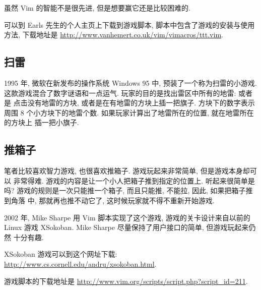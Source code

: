 虽然 Vim 的智能不是很先进, 但是想要赢它还是比较困难的.

可以到 Earls 先生的个人主页上下载到游戏脚本, 脚本中包含了游戏的安装与使用方法,
下载地址是 \url{http://www.vanhemert.co.uk/vim/vimacros/ttt.vim}.

\subsection{扫雷}
\label{subsec:mines}

1995 年, 微软在新发布的操作系统 Windows 95 中, 预装了一个称为扫雷的小游戏.
这款游戏混合了数字谜语和一点运气. 玩家的目的是找出雷区中所有的地雷: 或者是
点击没有地雷的方块, 或者是在有地雷的方块上插一把旗子. 方块下的数字表示周围
8 个小方块下的地雷个数. 如果玩家计算出了地雷所在的位置, 就在地雷所在的方块上
插一把小旗子.

\subsection{推箱子}
\label{subsec:sokoban}

笔者比较喜欢智力游戏, 也很喜欢推箱子. 游戏玩起来非常简单, 但是游戏本身却可以
非常得难. 游戏的内容是让一个小人把箱子推到指定的位置上. 听起来很简单是吗?
游戏的规则是一次只能推一个箱子, 而且只能推, 不能拉, 因此, 如果把箱子推到角落
中, 那就再也推不动它了, 这时候玩家就不得不重新开始游戏.

2002 年, Mike Sharpe 用 Vim 脚本实现了这个游戏, 游戏的关卡设计来自以前的
Linux 游戏 XSokoban. Mike Sharpe 尽量保持了用户接口的简单, 但游戏玩起来仍然
十分有趣.

\begin{warning}
    XSokoban 游戏可以到这个网址下载:
    \url{http://www.cs.cornell.edu/andru/xsokoban.html}.
\end{warning}

游戏脚本的下载地址是 \url{http://www.vim.org/scripts/script.php?script_id=211}.
